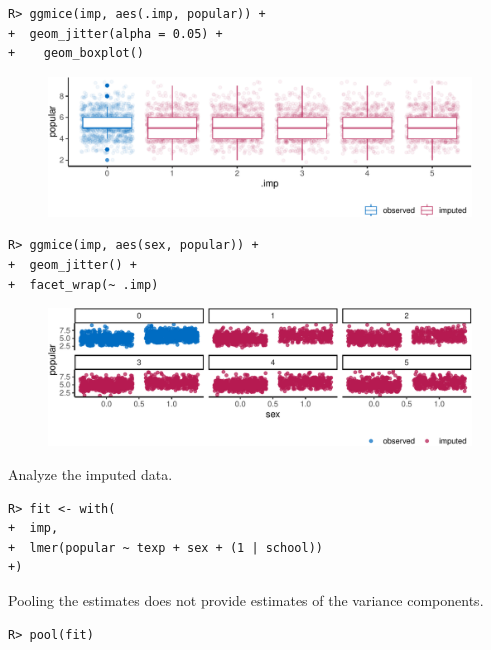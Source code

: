 \documentclass[
  article]{jss}
\begin{document}
\begin{verbatim}
R> ggmice(imp, aes(.imp, popular)) + 
+  geom_jitter(alpha = 0.05) +
+    geom_boxplot()
\end{verbatim}

\begin{figure}[h]

{\centering \includegraphics{manuscript_files/figure-pdf/unnamed-chunk-20-1.pdf}

}

\end{figure}

\begin{verbatim}
R> ggmice(imp, aes(sex, popular)) +
+  geom_jitter() +
+  facet_wrap(~ .imp)
\end{verbatim}

\begin{figure}[h]

{\centering \includegraphics{manuscript_files/figure-pdf/unnamed-chunk-21-1.pdf}

}

\end{figure}

Analyze the imputed data.

\begin{verbatim}
R> fit <- with(
+  imp,
+  lmer(popular ~ texp + sex + (1 | school))
+)
\end{verbatim}

Pooling the estimates does not provide estimates of the variance
components.

\begin{verbatim}
R> pool(fit)
\end{verbatim}
\end{document}
